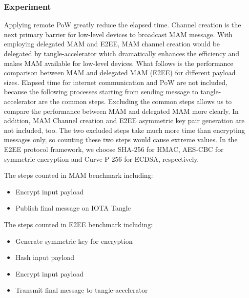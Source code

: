 \documentclass[conference]{IEEEtran}
\begin{document}
\subsubsection{Experiment}
Applying remote PoW greatly reduce the elapsed time. Channel creation is the next primary barrier for low-level devices to broadcast MAM message. With employing delegated MAM and E2EE, MAM channel creation would be delegated by tangle-accelerator which dramatically enhances the efficiency and makes MAM available for low-level devices. What follows is the performance comparison between MAM and delegated MAM (E2EE) for different payload sizes. Elapsed time for internet communication and PoW are not included, because the following processes starting from sending message to tangle-accelerator are the common steps. Excluding the common steps allows us to compare the performance between MAM and delegated MAM more clearly. In addition, MAM Channel creation and E2EE asymmetric key pair generation are not included, too. The two excluded steps take much more time than encrypting messages only, so counting these two steps would cause extreme values. In the E2EE protocol framework, we choose SHA-256 for HMAC, AES-CBC for symmetric encryption and Curve P-256 for ECDSA, respectively.

The steps counted in MAM benchmark including:
\begin{itemize}
	\item Encrypt input payload
	\item Publish final message on IOTA Tangle
\end{itemize}

The steps counted in E2EE benchmark including:
\begin{itemize}
	\item Generate symmetric key for encryption
	\item Hash input payload
	\item Encrypt input payload
	\item Transmit final message to tangle-accelerator
\end{itemize}

\begin{table}[htbp]
	\caption{Compare the performance between MAM and E2EE on Raspberry Pi}
    \label{tab:mam_vs_e2ee}
\end{table}
\end{document}
